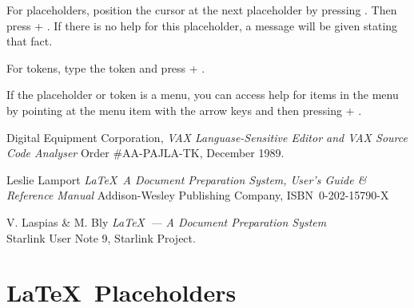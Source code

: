 For placeholders, position the cursor at the next placeholder by pressing
\nolinebreak. Then press \gold + \help. If there is no help for this
placeholder, a message will be given stating that fact.

For tokens, type the token and press \gold + \help.

If the placeholder or token is a menu, you can access help for items in the
menu by pointing at the menu item with the arrow keys and then pressing \gold +
\help.

\begin{thebibliography}{99}

 Digital Equipment Corporation,
{\em VAX Languase-Sensitive Editor and VAX Source Code Analyser}
Order \#AA-PAJLA-TK, December 1989.

 Leslie Lamport {\em \LaTeX\ A Document Preparation System,
User's Guide \& Reference Manual \/} Addison-Wesley Publishing Company,
ISBN~0-202-15790-X

 V. Laspias \& M. Bly {\em \LaTeX\ --- A Document Preparation
System} \\
Starlink User Note 9, Starlink Project.

\end{thebibliography}

\newpage
\appendix
\section{\LaTeX\ Placeholders}\label{place}

